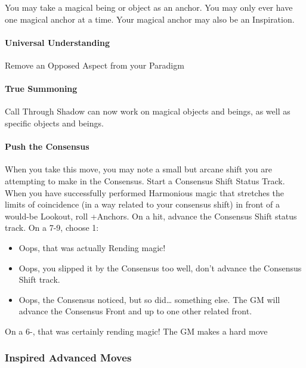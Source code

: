 \documentclass[
]{memoir}
\begin{document}
You may take a magical being or object as an anchor. You may only ever
have one magical anchor at a time. Your magical anchor may also be an
Inspiration.

\hypertarget{universal-understanding}{%
\paragraph{Universal Understanding}\label{universal-understanding}}

Remove an Opposed Aspect from your Paradigm

\hypertarget{true-summoning}{%
\paragraph{True Summoning}\label{true-summoning}}

Call Through Shadow can now work on magical objects and beings, as well
as specific objects and beings.

\hypertarget{push-the-consensus}{%
\paragraph{Push the Consensus}\label{push-the-consensus}}

When you take this move, you may note a small but arcane shift you are
attempting to make in the Consensus. Start a Consensus Shift Status
Track. When you have successfully performed Harmonious magic that
stretches the limits of coincidence (in a way related to your consensus
shift) in front of a would-be Lookout, roll +Anchors. On a hit, advance
the Consensus Shift status track. On a 7-9, choose 1:

\begin{itemize}
\item
  Oops, that was actually Rending magic!
\item
  Oops, you slipped it by the Consensus too well, don't advance the
  Consensus Shift track.
\item
  Oops, the Consensus noticed, but so did\ldots{} something else. The GM
  will advance the Consensus Front and up to one other related front.
\end{itemize}

On a 6-, that was certainly rending magic! The GM makes a hard move

\hypertarget{inspired-advanced-moves}{%
\subsubsection{Inspired Advanced Moves}\label{inspired-advanced-moves}}
\end{document}

